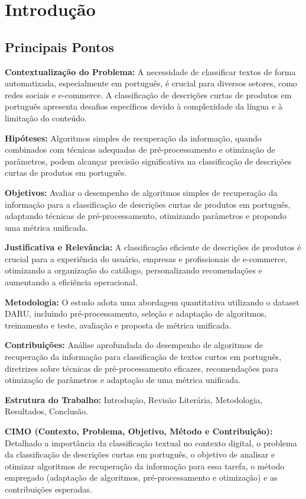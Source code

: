 \documentclass{report}
\begin{document}
\chapter{Introdução}

\section*{Principais Pontos}

\textbf{Contextualização do Problema:} A necessidade de classificar textos de forma automatizada, especialmente em português, é crucial para diversos setores, como redes sociais e e-commerce. A classificação de descrições curtas de produtos em português apresenta desafios específicos devido à complexidade da língua e à limitação do conteúdo.

\textbf{Hipóteses:} Algoritmos simples de recuperação da informação, quando combinados com técnicas adequadas de pré-processamento e otimização de parâmetros, podem alcançar precisão significativa na classificação de descrições curtas de produtos em português.

\textbf{Objetivos:} Avaliar o desempenho de algoritmos simples de recuperação da informação para a classificação de descrições curtas de produtos em português, adaptando técnicas de pré-processamento, otimizando parâmetros e propondo uma métrica unificada.

\textbf{Justificativa e Relevância:} A classificação eficiente de descrições de produtos é crucial para a experiência do usuário, empresas e profissionais de e-commerce, otimizando a organização do catálogo, personalizando recomendações e aumentando a eficiência operacional.

\textbf{Metodologia:} O estudo adota uma abordagem quantitativa utilizando o dataset DARU, incluindo pré-processamento, seleção e adaptação de algoritmos, treinamento e teste, avaliação e proposta de métrica unificada.

\textbf{Contribuições:} Análise aprofundada do desempenho de algoritmos de recuperação da informação para classificação de textos curtos em português, diretrizes sobre técnicas de pré-processamento eficazes, recomendações para otimização de parâmetros e adaptação de uma métrica unificada.

\textbf{Estrutura do Trabalho:} Introdução, Revisão Literária, Metodologia, Resultados, Conclusão.

\textbf{CIMO (Contexto, Problema, Objetivo, Método e Contribuição):} Detalhado a importância da classificação textual no contexto digital, o problema da classificação de descrições curtas em português, o objetivo de analisar e otimizar algoritmos de recuperação da informação para essa tarefa, o método empregado (adaptação de algoritmos, pré-processamento e otimização) e as contribuições esperadas.
\end{document}
